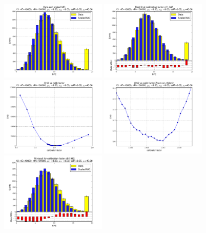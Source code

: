 
 \begin{figure}[htbp] \begin{center} 
\includegraphics[width=0.45\textwidth]{../FIGURES/13/FIG_Data_and_scaled_MC.pdf} 
\includegraphics[width=0.45\textwidth]{../FIGURES/13/FIG_Best_fit_at_calibration_factor_of_1_045.pdf} 
\includegraphics[width=0.45\textwidth]{../FIGURES/13/FIG_Chi2_vs_calib_factor.pdf} 
\includegraphics[width=0.45\textwidth]{../FIGURES/13/FIG_Chi2_vs_calib_factor_Zoom_on_chi2min.pdf} 
\includegraphics[width=0.45\textwidth]{../FIGURES/13/FIG_Fit_result_for_calibration_factor_of_0_982.pdf} 

\end{center}
\end{figure}
